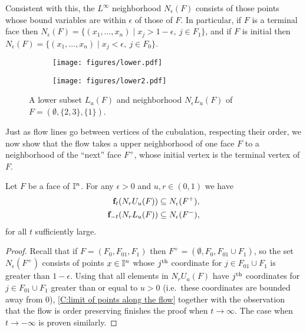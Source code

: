 Consistent with this, the $L^\infty$ neighborhood $N_\epsilon(F)$ consists of those points whose bound variables are within $\epsilon$ of those of $F$.
In particular, if $F$ is a terminal face then $N_\epsilon(F)=\{ (x_1,\ldots, x_n)\mid x_j>1-\epsilon,\ j\in F_1\}$, and if $F$ is initial then $N_\epsilon(F)=\{ (x_1,\ldots, x_n)\mid x_j<\epsilon,\ j\in F_0\}$.

\begin{figure}[!h]
	\centering
	\begin{subfigure}{.32\textwidth}
		\texttt{[image: figures/lower.pdf]}
		\hfill
	\end{subfigure}
	\begin{subfigure}{.32\textwidth}
		\hfill
		\texttt{[image: figures/lower2.pdf]}
	\end{subfigure}
	\caption{A lower subset $L_u(F)$ and neighborhood $N_\epsilon L_u(F)$ of $F = (\emptyset, \{2,3\}, \{1\})$.}
	\label{F:lower subspace and nbhd}
\end{figure}

Just as flow lines go between vertices of the cubulation, respecting their order, we now show that the flow takes a upper neighborhood of one face $F$ to a neighborhood of the ``next'' face $F^+$, whose initial vertex is the terminal vertex of $F$.

\begin{lemma}\label{L:flow to initial and terminal faces}
	Let $F$ be a face of $\mathbb{I}^n$.
	For any $\epsilon > 0$ and $u,r \in (0, 1)$ we have
	\begin{align*}
		\mathbf{f}_{t}(N_r U_u (F)) &\subseteq N_\epsilon (F^+), \\
		\mathbf{f}_{-t}(N_r L_u (F)) &\subseteq N_\epsilon (F^-),
	\end{align*}
	for all $t$ sufficiently large.
\end{lemma}

\begin{proof}
	Recall that if $F = (F_0, F_{01}, F_1)$ then $F^+ = (\emptyset, F_0, F_{01} \cup F_1)$, so the set $N_\epsilon (F^+)$ consists of points $x \in \mathbb{I}^n$ whose $j^{\mathrm{th}}$ coordinate for $j \in F_{01} \cup F_1$ is greater than $1-\epsilon$.
	Using that all elements in $N_r U_u (F)$ have $j^{\mathrm{th}}$ coordinates for $j \in F_{01} \cup F_1$ greater than or equal to $u > 0$ (i.e.\ these coordinates are bounded away from $0$), \cref{C:limit of points along the flow} together with the observation that the flow is order preserving finishes the proof when $t \to \infty$.
	The case when $t \to -\infty$ is proven similarly.
\end{proof}

